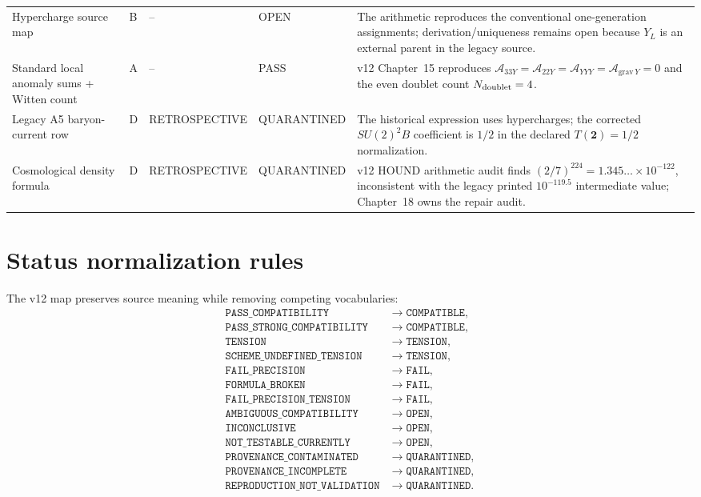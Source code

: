 \documentclass[11pt,a4paper,twoside]{book}
\theoremstyle{definition}
\begin{document}
{\begin{longtable}{p{}p{}p{}p{}p{}}
Hypercharge source map & B & -- & OPEN & The arithmetic reproduces the conventional one-generation assignments; derivation/uniqueness remains open because $Y_L$ is an external parent in the legacy source. \\
Standard local anomaly sums + Witten count & A & -- & PASS & v12 Chapter~15 reproduces $\mathcal A_{33Y}=\mathcal A_{22Y}=\mathcal A_{YYY}=\mathcal A_{\mathrm{grav}\,Y}=0$ and the even doublet count $N_{\rm doublet}=4$. \\
Legacy A5 baryon-current row & D & RETROSPECTIVE & QUARANTINED & The historical expression uses hypercharges; the corrected $SU(2)^2B$ coefficient is $1/2$ in the declared $T(\mathbf2)=1/2$ normalization. \\
Cosmological density formula & D & RETROSPECTIVE & QUARANTINED & v12 HOUND arithmetic audit finds $(2/7)^{224}=1.345\ldots\times10^{-122}$, inconsistent with the legacy printed $10^{-119.5}$ intermediate value; Chapter~18 owns the repair audit. \\
\bottomrule
\end{longtable}}

\section{Status normalization rules}

The v12 map preserves source meaning while removing competing vocabularies:
\begin{align*}
\texttt{PASS\_COMPATIBILITY}
&\longrightarrow \texttt{COMPATIBLE},\\
\texttt{PASS\_STRONG\_COMPATIBILITY}
&\longrightarrow \texttt{COMPATIBLE},\\
\texttt{TENSION}
&\longrightarrow \texttt{TENSION},\\
\texttt{SCHEME\_UNDEFINED\_TENSION}
&\longrightarrow \texttt{TENSION},\\
\texttt{FAIL\_PRECISION}
&\longrightarrow \texttt{FAIL},\\
\texttt{FORMULA\_BROKEN}
&\longrightarrow \texttt{FAIL},\\
\texttt{FAIL\_PRECISION\_TENSION}
&\longrightarrow \texttt{FAIL},\\
\texttt{AMBIGUOUS\_COMPATIBILITY}
&\longrightarrow \texttt{OPEN},\\
\texttt{INCONCLUSIVE}
&\longrightarrow \texttt{OPEN},\\
\texttt{NOT\_TESTABLE\_CURRENTLY}
&\longrightarrow \texttt{OPEN},\\
\texttt{PROVENANCE\_CONTAMINATED}
&\longrightarrow \texttt{QUARANTINED},\\
\texttt{PROVENANCE\_INCOMPLETE}
&\longrightarrow \texttt{QUARANTINED},\\
\texttt{REPRODUCTION\_NOT\_VALIDATION}
&\longrightarrow \texttt{QUARANTINED}.
\end{align*}
\end{document}
